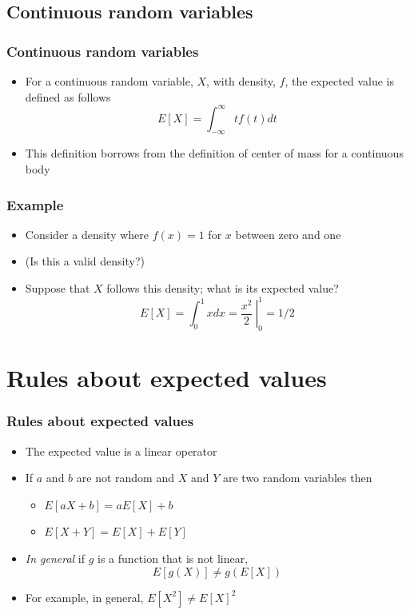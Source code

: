 \documentclass[aspectratio=169]{beamer}
\begin{document}
\subsection{Continuous random variables}
\begin{frame}\frametitle{Continuous random variables}
  \begin{itemize}
  \item For a continuous random variable, $X$, with density, $f$, the expected
    value is defined as follows
    $$
    E[X] = \int_{-\infty}^\infty t f(t)dt
    $$
  \item This definition borrows from the definition of center of mass for
    a continuous body
  \end{itemize}
\end{frame}

\begin{frame}\frametitle{Example}
  \begin{itemize}
  \item   Consider a density where $f(x) = 1$ for $x$
    between zero and one
  \item (Is this a valid density?)
  \item Suppose that $X$ follows this density; what is its expected value? 
    $$
    E[X] = \int_{0}^{1} x dx = \left. \frac{x^2}{2} ~\right|_{0}^{1} = 1/2
    $$
  \end{itemize}
\end{frame}

\section{Rules about expected values}
\begin{frame}\frametitle{Rules about expected values}
  \begin{itemize}
  \item The expected value is a linear operator 
  \item If $a$ and $b$ are not random and $X$ and $Y$ 
    are two random variables then
    \begin{itemize}
    \item $E[aX + b] = a E[X] + b$
    \item $E[X + Y] = E[X] + E[Y]$
    \end{itemize}
  \item {\em In general} if $g$ is a function that is not linear,
    $$
    E[g(X)] \neq g(E[X])
    $$
  \item For example, in general, $E[X^2] \neq E[X]^2$ 
  \end{itemize}
\end{frame}
\end{document}
